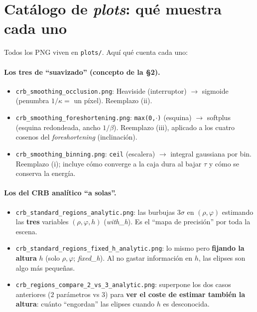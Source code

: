 \documentclass[11pt,a4paper]{article}
\begin{document}
\section{Cat\'alogo de \emph{plots}: qu\'e muestra cada uno}

Todos los PNG viven en \texttt{plots/}. Aqu\'i qu\'e cuenta cada uno:

\paragraph{Los tres de ``suavizado'' (concepto de la \S2).}
\begin{itemize}[nosep]
  \item \texttt{crb\_smoothing\_occlusion.png}: Heaviside (interruptor) $\to$
  sigmoide (penumbra $1/\kappa=$ un p\'ixel). Reemplazo (ii).
  \item \texttt{crb\_smoothing\_foreshortening.png}: \texttt{max(0,$\cdot$)}
  (esquina) $\to$ softplus (esquina redondeada, ancho $1/\beta$). Reemplazo (iii),
  aplicado a los cuatro cosenos del \emph{foreshortening} (inclinaci\'on).
  \item \texttt{crb\_smoothing\_binning.png}: \texttt{ceil} (escalera) $\to$
  integral gaussiana por bin. Reemplazo (i); incluye c\'omo converge a la caja
  dura al bajar $\tau$ y c\'omo se conserva la energ\'ia.
\end{itemize}

\paragraph{Los del CRB anal\'itico ``a solas''.}
\begin{itemize}[nosep]
  \item \texttt{crb\_standard\_regions\_analytic.png}: las burbujas $3\sigma$ en
  $(\rho,\varphi)$ estimando las \textbf{tres} variables $(\rho,\varphi,h)$
  (\emph{with\_h}). Es el ``mapa de precisi\'on'' por toda la escena.
  \item \texttt{crb\_standard\_regions\_fixed\_h\_analytic.png}: lo mismo pero
  \textbf{fijando la altura} $h$ (solo $\rho,\varphi$; \emph{fixed\_h}). Al no
  gastar informaci\'on en $h$, las elipses son algo m\'as peque\~nas.
  \item \texttt{crb\_regions\_compare\_2\_vs\_3\_analytic.png}: superpone los dos
  casos anteriores ($2$ par\'ametros vs $3$) para \textbf{ver el coste de estimar
  tambi\'en la altura}: cu\'anto ``engordan'' las elipses cuando $h$ es
  desconocida.
\end{itemize}
\end{document}
